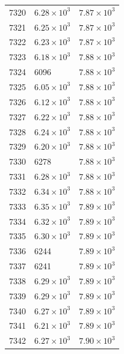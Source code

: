 \begin{table}[H]
\begin{tabular}{lll}
7320 & $\displaystyle 6.28 \times 10^{3}$ & $\displaystyle 7.87 \times 10^{3}$ \\
7321 & $\displaystyle 6.25 \times 10^{3}$ & $\displaystyle 7.87 \times 10^{3}$ \\
7322 & $\displaystyle 6.23 \times 10^{3}$ & $\displaystyle 7.87 \times 10^{3}$ \\
7323 & $\displaystyle 6.18 \times 10^{3}$ & $\displaystyle 7.88 \times 10^{3}$ \\
7324 & 6096 & $\displaystyle 7.88 \times 10^{3}$ \\
7325 & $\displaystyle 6.05 \times 10^{3}$ & $\displaystyle 7.88 \times 10^{3}$ \\
7326 & $\displaystyle 6.12 \times 10^{3}$ & $\displaystyle 7.88 \times 10^{3}$ \\
7327 & $\displaystyle 6.22 \times 10^{3}$ & $\displaystyle 7.88 \times 10^{3}$ \\
7328 & $\displaystyle 6.24 \times 10^{3}$ & $\displaystyle 7.88 \times 10^{3}$ \\
7329 & $\displaystyle 6.20 \times 10^{3}$ & $\displaystyle 7.88 \times 10^{3}$ \\
7330 & 6278 & $\displaystyle 7.88 \times 10^{3}$ \\
7331 & $\displaystyle 6.28 \times 10^{3}$ & $\displaystyle 7.88 \times 10^{3}$ \\
7332 & $\displaystyle 6.34 \times 10^{3}$ & $\displaystyle 7.88 \times 10^{3}$ \\
7333 & $\displaystyle 6.35 \times 10^{3}$ & $\displaystyle 7.89 \times 10^{3}$ \\
7334 & $\displaystyle 6.32 \times 10^{3}$ & $\displaystyle 7.89 \times 10^{3}$ \\
7335 & $\displaystyle 6.30 \times 10^{3}$ & $\displaystyle 7.89 \times 10^{3}$ \\
7336 & 6244 & $\displaystyle 7.89 \times 10^{3}$ \\
7337 & 6241 & $\displaystyle 7.89 \times 10^{3}$ \\
7338 & $\displaystyle 6.29 \times 10^{3}$ & $\displaystyle 7.89 \times 10^{3}$ \\
7339 & $\displaystyle 6.29 \times 10^{3}$ & $\displaystyle 7.89 \times 10^{3}$ \\
7340 & $\displaystyle 6.27 \times 10^{3}$ & $\displaystyle 7.89 \times 10^{3}$ \\
7341 & $\displaystyle 6.21 \times 10^{3}$ & $\displaystyle 7.89 \times 10^{3}$ \\
7342 & $\displaystyle 6.27 \times 10^{3}$ & $\displaystyle 7.90 \times 10^{3}$ \\

\end{tabular}
\end{table}
